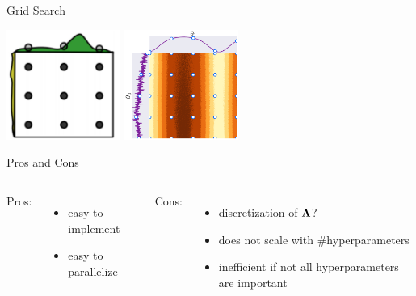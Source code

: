 \begin{frame}[c,fragile]{Grid Search }

\begin{center}
\includegraphics[width=0.28\textwidth]{images/grid_search}%
\includegraphics[width=0.28\textwidth]{images/gs}
\end{center}

\begin{block}{Pros and Cons}

\pause

\begin{columns}
Pros:
\begin{itemize}
  \item easy to implement
  \item easy to parallelize 
\end{itemize}

Cons:
\begin{itemize}
  \item discretization of $\mathbf{\Lambda}$?
  \item does not scale with $\#$hyperparameters
  \item inefficient if not all hyperparameters are important
\end{itemize}


\end{columns}

\end{block}

\end{frame}
